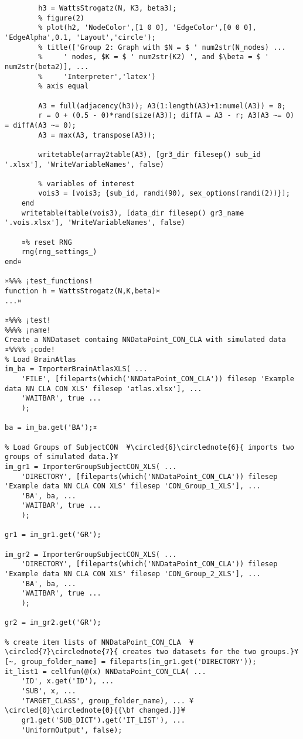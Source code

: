 \documentclass{tufte-handout}
\begin{document}
\begin{lstlisting}
        h3 = WattsStrogatz(N, K3, beta3);
        % figure(2)
        % plot(h2, 'NodeColor',[1 0 0], 'EdgeColor',[0 0 0], 'EdgeAlpha',0.1, 'Layout','circle');
        % title(['Group 2: Graph with $N = $ ' num2str(N_nodes) ...
        %     ' nodes, $K = $ ' num2str(K2) ', and $\beta = $ ' num2str(beta2)], ...
        %     'Interpreter','latex')
        % axis equal

        A3 = full(adjacency(h3)); A3(1:length(A3)+1:numel(A3)) = 0;
        r = 0 + (0.5 - 0)*rand(size(A3)); diffA = A3 - r; A3(A3 ~= 0) = diffA(A3 ~= 0);
        A3 = max(A3, transpose(A3));

        writetable(array2table(A3), [gr3_dir filesep() sub_id '.xlsx'], 'WriteVariableNames', false)

        % variables of interest
        vois3 = [vois3; {sub_id, randi(90), sex_options(randi(2))}];
    end
    writetable(table(vois3), [data_dir filesep() gr3_name '.vois.xlsx'], 'WriteVariableNames', false)

    ¤% reset RNG
    rng(rng_settings_)
end¤

¤%%% ¡test_functions!
function h = WattsStrogatz(N,K,beta)¤
...¤

¤%%% ¡test! 
%%%% ¡name!
Create a NNDataset containg NNDataPoint_CON_CLA with simulated data
¤%%%% ¡code!
% Load BrainAtlas
im_ba = ImporterBrainAtlasXLS( ...
    'FILE', [fileparts(which('NNDataPoint_CON_CLA')) filesep 'Example data NN CLA CON XLS' filesep 'atlas.xlsx'], ...
    'WAITBAR', true ...
    );

ba = im_ba.get('BA');¤

% Load Groups of SubjectCON  ¥\circled{6}\circlednote{6}{ imports two groups of simulated data.}¥
im_gr1 = ImporterGroupSubjectCON_XLS( ...
    'DIRECTORY', [fileparts(which('NNDataPoint_CON_CLA')) filesep 'Example data NN CLA CON XLS' filesep 'CON_Group_1_XLS'], ...
    'BA', ba, ...
    'WAITBAR', true ...
    );

gr1 = im_gr1.get('GR');

im_gr2 = ImporterGroupSubjectCON_XLS( ...
    'DIRECTORY', [fileparts(which('NNDataPoint_CON_CLA')) filesep 'Example data NN CLA CON XLS' filesep 'CON_Group_2_XLS'], ...
    'BA', ba, ...
    'WAITBAR', true ...
    );

gr2 = im_gr2.get('GR');

% create item lists of NNDataPoint_CON_CLA  ¥\circled{7}\circlednote{7}{ creates two datasets for the two groups.}¥
[~, group_folder_name] = fileparts(im_gr1.get('DIRECTORY'));
it_list1 = cellfun(@(x) NNDataPoint_CON_CLA( ...
    'ID', x.get('ID'), ...
    'SUB', x, ...
    'TARGET_CLASS', group_folder_name), ... ¥\circled{0}\circlednote{0}{{\bf changed.}}¥
    gr1.get('SUB_DICT').get('IT_LIST'), ...
    'UniformOutput', false);


\end{lstlisting}
\end{document}
